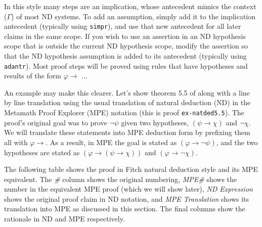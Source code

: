 In this style many steps are an implication, whose antecedent mimics
the context ($\Gamma$) of most ND systems. To add an assumption, simply add
it to the implication antecedent (typically using
\texttt{simpr}),
and use that
new antecedent for all later claims in the same scope. If you wish to
use an assertion in an ND hypothesis scope that is outside the current
ND hypothesis scope, modify the assertion so that the ND hypothesis
assumption is added to its antecedent (typically using \texttt{adantr}). Most
proof steps will be proved using rules that have hypotheses and results
of the form $\varphi \rightarrow$ ...

An example may make this clearer.
Let's show theorem 5.5 of
\cite[p.~18]{Clemente}
along with a line by line translation using the usual
translation of natural deduction (ND) in the Metamath Proof Explorer
(MPE) notation (this is proof \texttt{ex-natded5.5}).
The proof's original goal was to prove
$\lnot \psi$ given two hypotheses,
$( \psi \rightarrow \chi )$ and $ \lnot \chi$.
We will translate these statements into MPE deduction form
by prefixing them all with $\varphi \rightarrow$.
As a result, in MPE the goal is stated as
$( \varphi \rightarrow \lnot \psi )$, and the two hypotheses are stated as
$( \varphi \rightarrow ( \psi \rightarrow \chi ) )$ and
$( \varphi \rightarrow \lnot \chi )$.

The following table shows the proof in Fitch natural deduction style
and its MPE equivalent.
The \textit{\#} column shows the original numbering,
\textit{MPE\#} shows the number in the equivalent MPE proof
(which we will show later),
\textit{ND Expression} shows the original proof claim in ND notation,
and \textit{MPE Translation} shows its translation into MPE
as discussed in this section.
The final columns show the rationale in ND and MPE respectively.

